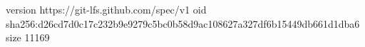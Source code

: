 version https://git-lfs.github.com/spec/v1
oid sha256:d26cd7d0c17c232b9e9279c5bc0b58d9ac108627a327df6b15449db661d1dba6
size 11169
